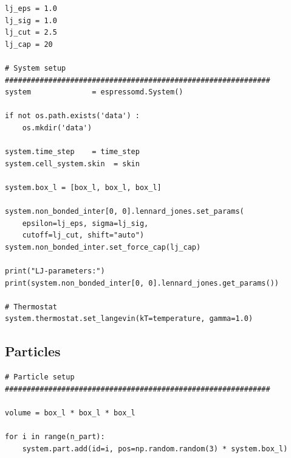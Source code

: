 \documentclass[
paper=a4,                       %
fontsize=11pt,                  %
twoside,                        %
footsepline,                    %
headsepline,                    %
headinclude=false,              %
footinclude=false,              %
pagesize,                       %
]{scrartcl}
\newtheorem{task}{Task}
\begin{document}
{{\begin{lstlisting}
lj_eps = 1.0
lj_sig = 1.0
lj_cut = 2.5
lj_cap = 20

# System setup
#############################################################
system              = espressomd.System()

if not os.path.exists('data') :
    os.mkdir('data')

system.time_step    = time_step
system.cell_system.skin  = skin

system.box_l = [box_l, box_l, box_l]

system.non_bonded_inter[0, 0].lennard_jones.set_params(
    epsilon=lj_eps, sigma=lj_sig,
    cutoff=lj_cut, shift="auto")
system.non_bonded_inter.set_force_cap(lj_cap)

print("LJ-parameters:")
print(system.non_bonded_inter[0, 0].lennard_jones.get_params())

# Thermostat
system.thermostat.set_langevin(kT=temperature, gamma=1.0)
\end{lstlisting}


\subsection{Particles}

\begin{lstlisting}
# Particle setup
#############################################################

volume = box_l * box_l * box_l

for i in range(n_part):
    system.part.add(id=i, pos=np.random.random(3) * system.box_l)
\end{lstlisting}}\vspace{0,2cm}

   \vspace{1cm}}
\end{document}
